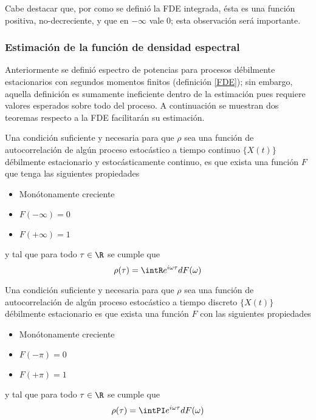 Cabe destacar que, por como se defini\'o la FDE integrada, \'esta es una funci\'on positiva, 
no-decreciente, y que en $-\infty$ vale 0; esta observaci\'on ser\'a importante.


\subsubsection{Estimaci\'on de la funci\'on de densidad espectral}

Anteriormente se defini\'o espectro de potencias para procesos d\'ebilmente estacionarios con 
segundos momentos finitos (definici\'on \ref{FDE}); sin embargo, aquella definici\'on es sumamente 
ineficiente dentro de la estimaci\'on pues requiere valores esperados sobre todo del proceso.
A continuaci\'on se muestran dos teoremas respecto a la FDE facilitar\'an su estimaci\'on.

\begin{thrm}
Una condici\'on suficiente y necesaria para que $\rho$ sea una funci\'on de autocorrelaci\'on de 
alg\'un proceso estoc\'astico a tiempo continuo $\{X(t)\}$ d\'ebilmente estacionario y 
estoc\'asticamente continuo, es que exista una funci\'on $F$ que tenga las siguientes propiedades
\begin{itemize}
\item Mon\'otonamente creciente
\item $F(-\infty) = 0$
\item $F(+\infty) = 1$
\end{itemize}
y tal que para todo $\tau \in \R$ se cumple que
\begin{equation*}
\rho(\tau) = \intR e^{i \omega \tau} dF(\omega)
\end{equation*}
\label{t_wienerkhinchin}
\end{thrm}

\begin{thrm}[Wold]
Una condici\'on suficiente y necesaria para que $\rho$ sea una funci\'on de autocorrelaci\'on de 
alg\'un proceso estoc\'astico a tiempo discreto $\{X(t)\}$ d\'ebilmente estacionario es que exista 
una funci\'on $F$ con las siguientes propiedades
\begin{itemize}
\item Mon\'otonamente creciente
\item $F(-\pi) = 0$
\item $F(+\pi) = 1$
\end{itemize}
y tal que para todo $\tau \in \R$ se cumple que
\begin{equation*}
\rho(\tau) = \intPI e^{i \omega \tau} dF(\omega)
\end{equation*}
\label{t_wold}
\end{thrm}

